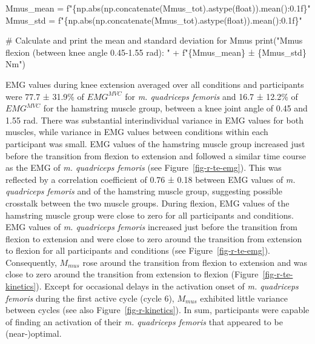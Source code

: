 \documentclass[
  11pt,
  a4paper]{article}
\newenvironment{Shaded}{\begin{snugshade}}{\end{snugshade}}
\newcommand{\BuiltInTok}[1]{\textcolor[rgb]{0.00,0.23,0.31}{#1}}
\newcommand{\CommentTok}[1]{\textcolor[rgb]{0.37,0.37,0.37}{#1}}
\newcommand{\NormalTok}[1]{\textcolor[rgb]{0.00,0.23,0.31}{#1}}
\newcommand{\OperatorTok}[1]{\textcolor[rgb]{0.37,0.37,0.37}{#1}}
\newcommand{\SpecialCharTok}[1]{\textcolor[rgb]{0.37,0.37,0.37}{#1}}
\newcommand{\SpecialStringTok}[1]{\textcolor[rgb]{0.13,0.47,0.30}{#1}}
\newcommand{\StringTok}[1]{\textcolor[rgb]{0.13,0.47,0.30}{#1}}
\begin{document}
\begin{Shaded}
\begin{Highlighting}[]
\NormalTok{Mmus\_mean }\OperatorTok{=} \SpecialStringTok{f"}\SpecialCharTok{\{}\NormalTok{np}\SpecialCharTok{.}\BuiltInTok{abs}\NormalTok{(np.concatenate(Mmus\_tot).astype(}\BuiltInTok{float}\NormalTok{))}\SpecialCharTok{.}\NormalTok{mean()}\SpecialCharTok{:0.1f\}}\SpecialStringTok{"}
\NormalTok{Mmus\_std }\OperatorTok{=} \SpecialStringTok{f"}\SpecialCharTok{\{}\NormalTok{np}\SpecialCharTok{.}\BuiltInTok{abs}\NormalTok{(np.concatenate(Mmus\_tot).astype(}\BuiltInTok{float}\NormalTok{))}\SpecialCharTok{.}\NormalTok{mean()}\SpecialCharTok{:0.1f\}}\SpecialStringTok{"}

\CommentTok{\# Calculate and print the mean and standard deviation for Mmus}
\BuiltInTok{print}\NormalTok{(}\StringTok{"Mmus flexion (between knee angle 0.45{-}1.55 rad): "} \OperatorTok{+}
      \SpecialStringTok{f"}\SpecialCharTok{\{}\NormalTok{Mmus\_mean}\SpecialCharTok{\}}\SpecialStringTok{ ± }\SpecialCharTok{\{}\NormalTok{Mmus\_std}\SpecialCharTok{\}}\SpecialStringTok{ Nm"}\NormalTok{)}
\end{Highlighting}
\end{Shaded}

EMG values during knee extension averaged over all conditions and
participants were 77.7 ± 31.9\% of \(EMG^{MVC}\) for \emph{m. quadriceps
femoris} and 16.7 ± 12.2\% of \(EMG^{MVC}\) for the hamstring muscle
group, between a knee joint angle of 0.45 and 1.55 rad. There was
substantial interindividual variance in EMG values for both muscles,
while variance in EMG values between conditions within each participant
was small. EMG values of the hamstring muscle group increased just
before the transition from flexion to extension and followed a similar
time course as the EMG of \emph{m. quadriceps femoris} (see
Figure~\ref{fig-r-te-emg}). This was reflected by a correlation
coefficient of 0.76 ± 0.18 between EMG values of \emph{m. quadriceps
femoris} and of the hamstring muscle group, suggesting possible
crosstalk between the two muscle groups. During flexion, EMG values of
the hamstring muscle group were close to zero for all participants and
conditions. EMG values of \emph{m. quadriceps femoris} increased just
before the transition from flexion to extension and were close to zero
around the transition from extension to flexion for all participants and
conditions (see Figure~\ref{fig-r-te-emg}). Consequently, \(M_{mus}\)
rose around the transition from flexion to extension and was close to
zero around the transition from extension to flexion
(Figure~\ref{fig-r-te-kinetics}). Except for occasional delays in the
activation onset of \emph{m. quadriceps femoris} during the first active
cycle (cycle 6), \(M_{mus}\) exhibited little variance between cycles
(see also Figure~\ref{fig-r-kinetics}). In sum, participants were
capable of finding an activation of their \emph{m. quadriceps femoris}
that appeared to be (near-)optimal.
\end{document}
